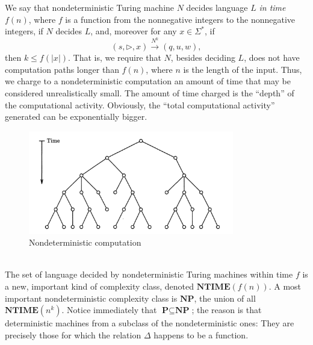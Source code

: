 \documentclass[12pt]{article}
\begin{document}
We say that nondeterministic Turing machine $N$ decides language $L$ \textit{in time} $f(n)$, where $f$ is a function from the nonnegative integers to the nonnegative integers, if $N$ decides $L$, and, moreover for any $x \in \Sigma^*$, if 
\[
(s, \triangleright, x) \stackrel{N^k}{\rightarrow} (q, u, w),
\]
then $k \leq f(|x|)$. That is, we require that $N$, besides deciding $L$, does not have computation paths longer than $f(n)$, where $n$ is the length of the input. Thus, we charge to a nondeterministic computation an amount of time that may be considered unrealistically small. The amount of time charged is the ``depth'' of the computational activity. Obviously, the ``total computational activity'' generated can be exponentially bigger.
\begin{figure}[ht]
    \centering
    \includegraphics[width=0.8\textwidth]{img/ndc.png}
    \caption{Nondeterministic computation}
    \label{fig:nondeterministic}
\end{figure}
\\
The set of language decided by nondeterministic Turing machines within time $f$ is a new, important kind of complexity class, denoted $\textbf{NTIME}(f(n))$. A most important nondeterministic complexity class is $\textbf{NP}$, the union of all $\textbf{NTIME}(n^k)$. Notice immediately that $\textbf{P}\subseteq\textbf{NP}$; the reason is that deterministic machines from a subclass of the nondeterministic ones: They are precisely those for which the relation $\Delta$ happens to be a function.
\end{document}
